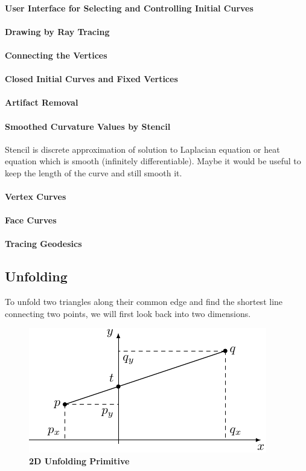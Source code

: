 \documentclass{stdlocal}
\begin{document}
  \paragraph{User Interface for Selecting and Controlling Initial Curves}
  \paragraph{Drawing by Ray Tracing}
  \paragraph{Connecting the Vertices}
  \paragraph{Closed Initial Curves and Fixed Vertices}
  \paragraph{Artifact Removal}
  \paragraph{Smoothed Curvature Values by Stencil}
    Stencil is discrete approximation of solution to Laplacian equation or heat equation which is smooth (infinitely differentiable).
    Maybe it would be useful to keep the length of the curve and still smooth it.
  \paragraph{Vertex Curves}
  \paragraph{Face Curves}
  \paragraph{Tracing Geodesics}

\subsection{Unfolding} %
\label{sub:unfolding}
To unfold two triangles along their common edge and find the shortest line connecting two points, we will first look back into two dimensions.

\begin{figure}[h]
  \centering
  \includegraphics[width=0.6\linewidth]{figures/unfolding_geodesic_2d.pdf}
  \caption[2D Unfolding Primitive]{%
    \textbf{2D Unfolding Primitive}
  }
\end{figure}
\end{document}
